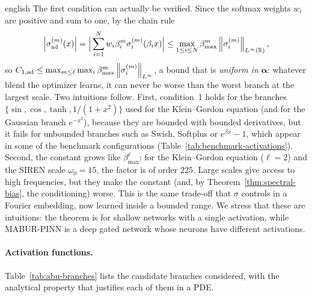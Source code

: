 \documentclass[0000.tex]{subfiles}
\begin{document}
\begin{hyphenrules}{english}
The first condition can actually be verified. Since the softmax weights $w_i$ are positive and sum to one,
by the chain rule
\begin{equation}
  \left\lvert \sigma^{(m)}_{\mathrm{ad}}(x) \right\rvert=\Big|\sum_{i=1}^{N}w_i\beta_i^{m}\sigma_i^{(m)}(\beta_ix)\Big|
  \le\max_{1\le i\le N}\beta_{\max}^{m}\left\lVert \sigma_i^{(m)} \right\rVert_{L^\infty(\mathbb{R})},
  \label{eq:abu-bound}
\end{equation}
so $C_{1,\mathrm{ad}}\le\max_{m\le\ell}\max_i\beta_{\max}^{m}\left\lVert \sigma_i^{(m)} \right\rVert_{L^\infty}$, a bound that is
\emph{uniform in} $\bm\alpha$: whatever blend the optimizer learns, it can never be worse than the worst
branch at the largest scale. Two intuitions follow. First, condition~1 holds for the branches
$\{\sin,\cos,\tanh,1/(1+x^2)\}$ used for the Klein--Gordon equation (and for the Gaussian branch
$e^{-x^2}$), because they are bounded with bounded derivatives, but it fails for unbounded branches such as
Swish, Softplus or $e^{\beta x}-1$, which appear in some of the benchmark configurations
(Table~\ref{tab:benchmark-activations}). Second, the constant grows like $\beta_{\max}^{\ell}$: for the
Klein--Gordon equation ($\ell=2$) and the SIREN scale $\omega_0=15$, the factor is of order $225$. Large
scales give access to high frequencies, but they make the constant (and, by Theorem~\ref{thm:spectral-bias}, the
conditioning) worse. This is the same trade-off that $\sigma$ controls in a Fourier embedding, now learned
inside a bounded range. We stress that these are intuitions: the theorem is for shallow networks with a
single activation, while MABUR-PINN is a deep gated network whose neurons have different activations.

\paragraph{Activation functions.}
Table~\ref{tab:abu-branches} lists the candidate branches considered, with the analytical property that
justifies each of them in a PDE.


\end{hyphenrules}
\end{document}
